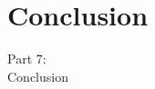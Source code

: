 \section{Conclusion}
\begin{frame}
  \vspace{25mm}
  \begin{center}
    \Huge{Part 7:\\Conclusion}
  \end{center}
\end{frame}
